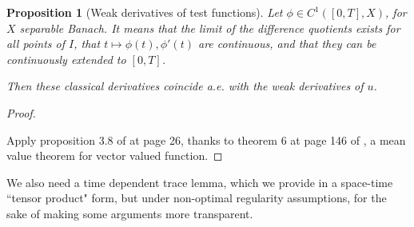 \documentclass[english,a4paper,9pt,oneside]{scrbook}	%
\theoremstyle{break}
\newtheorem{prop}[equation]{Proposition}
\newenvironment{mproof}[1][\proofname]{%
  \begin{proof}[#1]$ $\par\nobreak\ignorespaces
}{%
  \end{proof}
}
\renewcommand*{\proofname}{Proof}
\theoremstyle{remark}
\newcommand{\emb}{\hookrightarrow}
\begin{document}
\begin{appendices}
%
%
%


\begin{prop}[Weak derivatives of test functions]
\label{prop:weak_class}
Let $\phi \in C^1([0,T],X)$, for $X$ separable Banach. It means that the limit of the difference quotients exists for all points of $I$, that $t\mapsto \phi(t), \phi'(t)$ are continuous, and that they can be continuously extended to $[0,T]$.

Then these classical derivatives coincide a.e. with the weak derivatives of $u$.

\end{prop}
\begin{mproof}


Apply proposition 3.8 of \cite{kreuter} at page 26, thanks to theorem 6 at page 146 of \cite{mvt}, a mean value theorem for vector valued function.
\end{mproof}

We also need a time dependent trace lemma, which we provide in a space-time ``tensor product" form, but under non-optimal regularity assumptions, for the sake of making some arguments more transparent.


\end{appendices}
\end{document}
